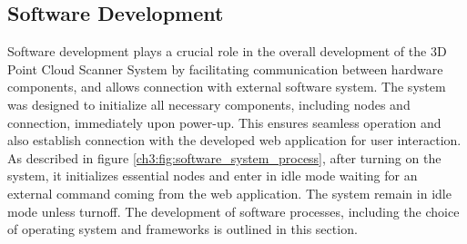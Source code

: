 





\subsection{Software Development}
\label{ch3:sec:firmware_development_design}

Software development plays a crucial role in the overall development of the 3D Point Cloud Scanner System by facilitating communication between hardware components, and allows connection with external software system. The system was designed to initialize all necessary components, including nodes and connection, immediately upon power-up. This ensures seamless operation and also establish connection with the developed web application for user interaction. As described in figure \ref{ch3:fig:software_system_process}, after turning on the system, it initializes essential nodes and enter in idle mode waiting for an external command coming from the web application. The system remain in idle mode unless turnoff. The development of software processes, including the choice of operating system and frameworks is outlined in this section.

